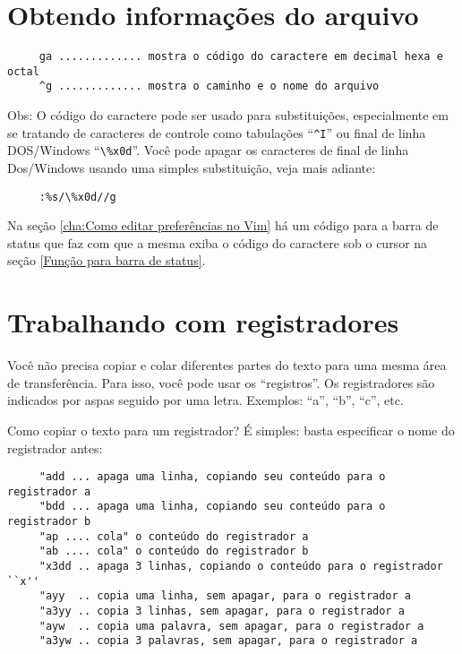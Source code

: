 \section{Obtendo informações do arquivo}

\begin{verbatim}
     ga ............. mostra o código do caractere em decimal hexa e octal
     ^g ............. mostra o caminho e o nome do arquivo
\end{verbatim}

Obs: O código do caractere pode ser usado para substituições,
especialmente em se tratando de caracteres de controle como tabulações
``\verb|^I|'' ou final de linha DOS/Windows ``\verb|\%x0d|''. Você pode apagar os
caracteres de final de linha Dos/Windows usando uma simples
substituição, veja mais adiante:

\begin{verbatim}
     :%s/\%x0d//g
\end{verbatim}

Na seção \ref{cha:Como editar preferências no Vim} há um código para a barra de
status que faz com que a mesma exiba o código do caractere sob o cursor na
seção \ref{Função para barra de status}.

\section{Trabalhando com registradores}
\label{Trabalhando com registradores}

Você não precisa copiar e colar diferentes partes do texto para uma
mesma área de transferência.  Para isso, você pode usar os
``registros''.  Os registradores são indicados por aspas seguido por uma letra.
Exemplos: ``a'', ``b'', ``c'', etc.

Como copiar o texto para um registrador? É simples: basta especificar
o nome do registrador antes:

\begin{verbatim}
     "add ... apaga uma linha, copiando seu conteúdo para o registrador a
     "bdd ... apaga uma linha, copiando seu conteúdo para o registrador b
     "ap .... cola" o conteúdo do registrador a
     "ab .... cola" o conteúdo do registrador b
     "x3dd .. apaga 3 linhas, copiando o conteúdo para o registrador ``x''
     "ayy  .. copia uma linha, sem apagar, para o registrador a
     "a3yy .. copia 3 linhas, sem apagar, para o registrador a
     "ayw  .. copia uma palavra, sem apagar, para o registrador a
     "a3yw .. copia 3 palavras, sem apagar, para o registrador a
\end{verbatim}

